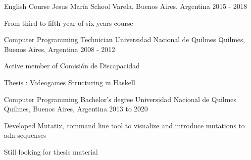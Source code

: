 

\begin{cventries}

  \cventry
    {English Course} %
    {Jesus María School} %
    {Varela, Buenos Aires, Argentina} %
    {2015 - 2018} %
    {
      \begin{cvitems} %
        \item {From third to fifth year of six years course}
      \end{cvitems}
    }

  \cventry
    {Computer Programming Technician} %
    {Universidad Nacional de Quilmes} %
    {Quilmes, Buenos Aires, Argentina} %
    {2008 - 2012} %
    {
      \begin{cvitems} %
        \item {Active member of Comisión de Discapacidad}
        \item {Thesis : Videogames Structuring in Haskell}
      \end{cvitems}
    }

  \cventry
    {Computer Programming Bachelor's degree} %
    {Universidad Nacional de Quilmes} %
    {Quilmes, Buenos Aires, Argentina} %
    {2013 to 2020} %
    {
      \begin{cvitems} %
        \item { Developed Mutatix, command line tool to visualize and introduce mutations to adn sequenses}
        \item {Still looking for thesis material}
      \end{cvitems}
    }


\end{cventries}
